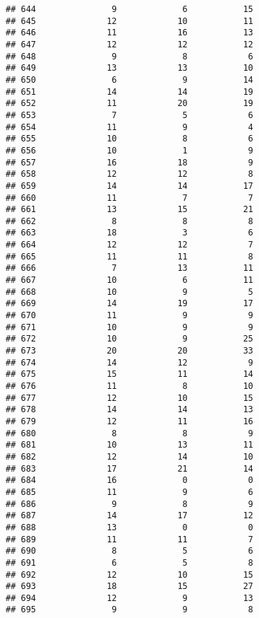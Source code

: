 \documentclass[
]{article}
\begin{document}
\begin{verbatim}
## 644               9             6           15
## 645              12            10           11
## 646              11            16           13
## 647              12            12           12
## 648               9             8            6
## 649              13            13           10
## 650               6             9           14
## 651              14            14           19
## 652              11            20           19
## 653               7             5            6
## 654              11             9            4
## 655              10             8            6
## 656              10             1            9
## 657              16            18            9
## 658              12            12            8
## 659              14            14           17
## 660              11             7            7
## 661              13            15           21
## 662               8             8            8
## 663              18             3            6
## 664              12            12            7
## 665              11            11            8
## 666               7            13           11
## 667              10             6           11
## 668              10             9            5
## 669              14            19           17
## 670              11             9            9
## 671              10             9            9
## 672              10             9           25
## 673              20            20           33
## 674              14            12            9
## 675              15            11           14
## 676              11             8           10
## 677              12            10           15
## 678              14            14           13
## 679              12            11           16
## 680               8             8            9
## 681              10            13           11
## 682              12            14           10
## 683              17            21           14
## 684              16             0            0
## 685              11             9            6
## 686               9             8            9
## 687              14            17           12
## 688              13             0            0
## 689              11            11            7
## 690               8             5            6
## 691               6             5            8
## 692              12            10           15
## 693              18            15           27
## 694              12             9           13
## 695               9             9            8

\end{verbatim}
\end{document}
